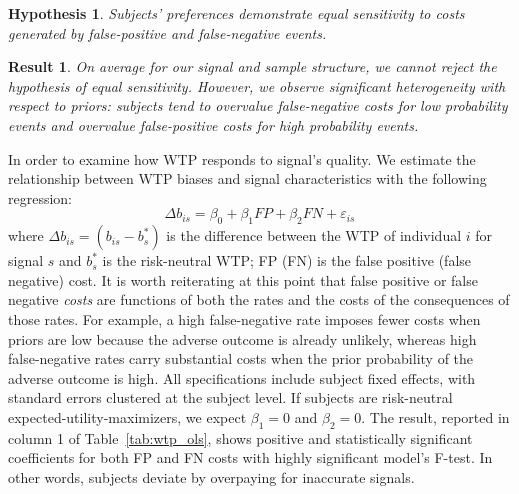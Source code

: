 \documentclass[12pt,a4paper]{article}
\newtheorem{hypothesis}{Hypothesis}
\newtheorem{result}{Result}
\begin{document}

%






\begin{hypothesis}\label{hyp:eqSen} 
Subjects' preferences demonstrate equal sensitivity to costs generated by false-positive and false-negative events. 
\end{hypothesis}

\begin{result} 
On average for our signal and sample structure, we cannot reject the hypothesis of equal sensitivity. However, we observe significant heterogeneity with respect to priors: subjects tend to overvalue false-negative costs for low probability events and overvalue false-positive costs for high probability events. 
\end{result}


In order to examine how WTP responds to signal's quality. We estimate the relationship between WTP biases and signal characteristics with the following regression:
\[\Delta b_{is} = \beta_0 + \beta_1 FP + \beta_2 FN + \varepsilon_{is}\]
where $\Delta b_{is} = (b_{is} - b^*_s)$ is the difference between the WTP of individual $i$ for signal $s$ and $b^*_s$ is the risk-neutral WTP; FP (FN) is the false positive (false negative) cost.  It is worth reiterating at this point that false positive or false negative \textit{costs} are functions of both the rates and the costs of the consequences of those rates.  For example, a high false-negative rate imposes fewer costs when priors are low because the adverse outcome is already unlikely, whereas high false-negative rates carry substantial costs when the prior probability of the adverse outcome is high. All specifications include subject fixed effects, with standard errors clustered at the subject level. If subjects are risk-neutral expected-utility-maximizers, we expect $\beta_1=0$ and $\beta_2=0$. The result, reported in column 1 of Table~\ref{tab:wtp_ols}, shows positive and statistically significant coefficients for both FP and FN costs with highly significant model's F-test. In other words, subjects deviate by overpaying for inaccurate signals. 
\end{document}
